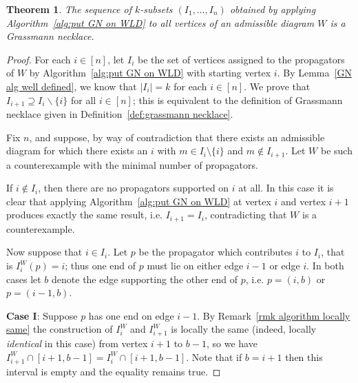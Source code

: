 \documentclass[11pt]{article}
\newcommand{\note}{\todo[color=green!40]}
\def\bas #1\eas{\begin{align*} #1 \end{align*}}
\newtheorem{thm}{Theorem}[section]
\theoremstyle{remark}
\theoremstyle{definition}
\begin{document}
\begin{thm}\label{res:alg gives GN}
The sequence of $k$-subsets $(I_1,\dots,I_n)$ obtained by applying Algorithm~\ref{alg:put GN on WLD} to all vertices of an admissible diagram $W$ is a Grassmann necklace.
\end{thm}
\begin{proof}
For each $i \in [n]$, let $I_i$ be the set of vertices assigned to the propagators of $W$ by Algorithm~\ref{alg:put GN on WLD} with starting vertex $i$. By Lemma~\ref{GN alg well defined}, we know that $|I_i| = k$ for each $i \in [n]$. We prove that $I_{i+1} \supseteq I_i \backslash \{i\}$ for all $i \in [n]$; this is equivalent to the definition of Grassmann necklace given in Definition~\ref{def:grassmann necklace}.

Fix $n$, and suppose, by way of contradiction that there exists an admissible diagram for which there exists an $i$ with $m\in I_i\setminus \{i\}$ and $m \not\in I_{i+1}$.  Let $W$ be such a counterexample with the minimal number of propagators.

If $i \not\in I_i$, then there are no propagators supported on $i$ at all.  In this case it is clear that applying Algorithm~\ref{alg:put GN on WLD} at vertex $i$ and vertex $i+1$ produces exactly the same result, i.e. $I_{i+1} = I_i$, contradicting that $W$ is a counterexample.

Now suppose that $i \in I_i$.  Let $p$ be the propagator which contributes $i$ to $I_i$, that is $I^W_i(p) = i$; thus one end of $p$ must lie on either edge $i-1$ or edge $i$.  In both cases let $b$ denote the edge supporting the other end of $p$, i.e. $p = (i, b)$ or $p = (i-1, b)$.


\textbf{Case I}:  Suppose $p$ has one end on edge $i-1$. By Remark~\ref{rmk algorithm locally same} the construction of $I_i^W$ and $I_{i+1}^W$ is locally the same (indeed, locally {\em identical} in this case) from vertex $i+1$ to $b-1$, so we have $I_{i+1}^W \cap [i+1,b-1] = I_{i}^W \cap [i+1,b-1]$. Note that if $b = i+1$ then this interval is empty and the equality remains true.



\end{proof}
\end{document}
